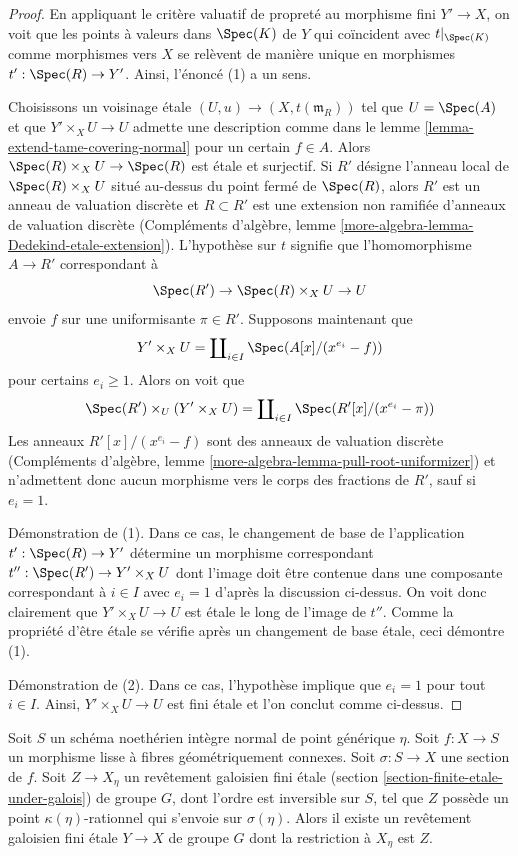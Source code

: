 \begin{proof}
En appliquant le critère valuatif de propreté au
morphisme fini $Y' \to X$, on voit que les points à valeurs dans $\Spec(K)$
de $Y$ qui coïncident avec $t|_{\Spec(K)}$ comme morphismes vers $X$
se relèvent de manière unique en morphismes $t' : \Spec(R) \to Y'$.
Ainsi, l'énoncé (1) a un sens.

\medskip\noindent
Choisissons un voisinage \'etale $(U, u) \to (X, t(\mathfrak m_R))$
tel que $U = \Spec(A)$ et que $Y' \times_X U \to U$
admette une description comme dans le lemme \ref{lemma-extend-tame-covering-normal}
pour un certain $f \in A$. Alors $\Spec(R) \times_X U \to \Spec(R)$ est \'etale
et surjectif. Si $R'$ désigne l'anneau local de
$\Spec(R) \times_X U$ situé au-dessus du point fermé de $\Spec(R)$,
alors $R'$ est un anneau de valuation discrète et $R \subset R'$
est une extension non ramifiée d'anneaux de valuation discrète
(Compléments d'algèbre, lemme \ref{more-algebra-lemma-Dedekind-etale-extension}).
L'hypothèse sur $t$ signifie que l'homomorphisme $A \to R'$
correspondant à
$$
\Spec(R') \to \Spec(R) \times_X U \to U
$$
envoie $f$ sur une uniformisante $\pi \in R'$. Supposons maintenant que
$$
Y' \times_X U =
\coprod\nolimits_{i \in I} \Spec(A[x]/(x^{e_i} - f))
$$
pour certains $e_i \geq 1$. Alors on voit que
$$
\Spec(R') \times_U (Y' \times_X U) =
\coprod\nolimits_{i \in I} \Spec(R'[x]/(x^{e_i} - \pi))
$$
Les anneaux $R'[x]/(x^{e_i} - f)$ sont des anneaux de valuation discrète
(Compléments d'algèbre, lemme \ref{more-algebra-lemma-pull-root-uniformizer})
et n'admettent donc aucun morphisme vers le corps des fractions de $R'$, sauf si $e_i = 1$.

\medskip\noindent
Démonstration de (1). Dans ce cas, le changement de base de l'application $t' : \Spec(R) \to Y'$
détermine un morphisme correspondant $t'' : \Spec(R') \to Y' \times_X U$
dont l'image doit être contenue dans une composante correspondant à $i \in I$ avec $e_i = 1$
d'après la discussion ci-dessus. On voit donc clairement que $Y' \times_X U \to U$
est \'etale le long de l'image de $t''$. Comme la propriété d'être \'etale
se vérifie après un changement de base \'etale, ceci démontre (1).

\medskip\noindent
Démonstration de (2). Dans ce cas, l'hypothèse implique que $e_i = 1$
pour tout $i \in I$. Ainsi, $Y' \times_X U \to U$ est fini \'etale
et l'on conclut comme ci-dessus.
\end{proof}

\begin{lemma}
\label{lemma-extend-covering}
Soit $S$ un schéma noethérien intègre normal de point générique $\eta$.
Soit $f : X \to S$ un morphisme lisse à fibres géométriquement connexes.
Soit $\sigma : S \to X$ une section de $f$. Soit $Z \to X_\eta$ un
revêtement galoisien fini \'etale (section \ref{section-finite-etale-under-galois})
de groupe $G$, dont l'ordre est inversible sur $S$, tel que
$Z$ possède un point $\kappa(\eta)$-rationnel qui s'envoie sur $\sigma(\eta)$.
Alors il existe un revêtement galoisien fini \'etale $Y \to X$ de groupe $G$
dont la restriction à $X_\eta$ est $Z$.
\end{lemma}

